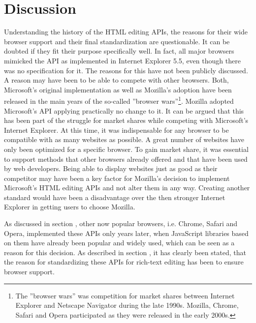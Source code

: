 
\section{Discussion}

Understanding the history of the HTML editing APIs, the reasons for their wide browser support and their final standardization are questionable. It can be doubted if they fit their purpose specifically well. In fact, all major browsers mimicked the API as implemented in Internet Explorer 5.5, even though there was no specification for it. The reasons for this have not been publicly discussed. A reason may have been to be able to compete with other browsers. Both, Microsoft's original implementation as well as Mozilla's adoption have been released in the main years of the so-called ''browser wars''\footnote{The ''browser wars'' was competition for market shares between Internet Explorer and Netscape Navigator during the late 1990s. Mozilla, Chrome, Safari and Opera participated as they were released in the early 2000s.}. Mozilla adopted Microsoft's API applying practically no change to it. It can be argued that this has been part of the struggle for market shares while competing with Microsoft's Internet Explorer. At this time, it was indispensable for any browser to be compatible with as many websites as possible. A great number of websites have only been optimized for a specific browser. To gain market share, it was essential to support methods that other browsers already offered and that have been used by web developers. Being able to display websites just as good as their competitor may have been a key factor for Mozilla's decision to implement Microsoft's HTML editing APIs and not alter them in any way. Creating another standard would have been a disadvantage over the then stronger Internet Explorer in getting users to choose Mozilla. 

As discussed in section , other now popular browsers, i.e. Chrome, Safari and Opera, implemented these APIs only years later, when JavaScript libraries based on them have already been popular and widely used, which can be seen as a reason for this decision. As described in section , it has clearly been stated, that the reason for standardizing these APIs for rich-text editing has been to ensure browser support.

